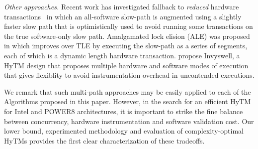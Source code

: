 \vspace{1mm}\noindent\textit{Other approaches.}
Recent work has investigated fallback to \emph{reduced} hardware transactions~\cite{MS13}
in which an all-software slow-path is augmented using a slightly faster slow path 
that is optimistically used to avoid running some transactions on the true software-only slow path.
Amalgamated lock elision (ALE) was proposed in \cite{ale15} which improves over TLE
by executing the slow-path as a series of segments, each of which is a dynamic length hardware transaction.
\cite{Calciu14} propose Invyswell, a HyTM design that proposes multiple hardware and software modes of execution that gives flexiblity to avoid instrumentation overhead in uncontended executions.

We remark that such multi-path approaches may be easily applied to each of the Algorithms proposed in this paper. However, 
in the search for an efficient HyTM for Intel and POWER8 architectures, it is important to strike the fine balance between concurrency, hardware instrumentation and software validation cost.
Our lower bound, experimented methodology and evaluation of complexity-optimal HyTMs provides the first clear characterization of these tradeoffs. 
